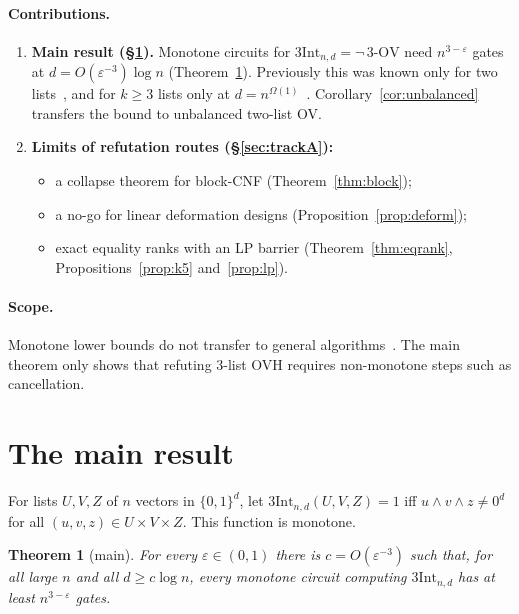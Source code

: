 \documentclass[11pt,a4paper]{article}
\theoremstyle{plain}
\newtheorem{theorem}{Theorem}
\theoremstyle{definition}
\theoremstyle{remark}
\newcommand{\OV}{\mathrm{OV}}
\newcommand{\tInt}{3\mathrm{Int}}
\begin{document}
\paragraph{Contributions.}
\begin{enumerate}[leftmargin=16pt]
  \item \textbf{Main result (\S\ref{sec:main}).} Monotone circuits for $\tInt_{n,d}=\neg\,3\text{-}\OV$ need
    $n^{3-\varepsilon}$ gates at $d=O(\varepsilon^{-3})\log n$ (Theorem~\ref{thm:main}). Previously this was known only
    for two lists~\cite[Thm~5]{CLSS26}, and for $k\ge3$ lists only at $d=n^{\Omega(1)}$~\cite[Thm~4]{CLSS26}.
    Corollary~\ref{cor:unbalanced} transfers the bound to unbalanced two-list OV.
  \item \textbf{Limits of refutation routes (\S\ref{sec:trackA}):}
    \begin{itemize}[leftmargin=12pt]
      \item a collapse theorem for block-CNF (Theorem~\ref{thm:block});
      \item a no-go for linear deformation designs (Proposition~\ref{prop:deform});
      \item exact equality ranks with an LP barrier (Theorem~\ref{thm:eqrank}, Propositions~\ref{prop:k5}
        and~\ref{prop:lp}).
    \end{itemize}
\end{enumerate}

\paragraph{Scope.} Monotone lower bounds do not transfer to general algorithms~\cite{Raz85,Tar88}. The main theorem
only shows that refuting 3-list OVH requires non-monotone steps such as cancellation.

\section{The main result}\label{sec:main}

For lists $U,V,Z$ of $n$ vectors in $\{0,1\}^d$, let $\tInt_{n,d}(U,V,Z)=1$ iff $u\wedge v\wedge z\ne0^d$ for all
$(u,v,z)\in U\times V\times Z$. This function is monotone.

\begin{theorem}[main]\label{thm:main}
For every $\varepsilon\in(0,1)$ there is $c=O(\varepsilon^{-3})$ such that, for all large $n$ and all $d\ge c\log n$,
every monotone circuit computing $\tInt_{n,d}$ has at least $n^{3-\varepsilon}$ gates.
\end{theorem}
\end{document}
